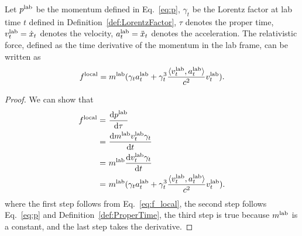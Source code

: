 \begin{lemma}\label{lem:equiv_relativistic_force:formal}
Let $p^{\rm lab}$ be the momentum defined in Eq.~\eqref{eq:p}, $\gamma_t$ be the Lorentz factor at lab time $t$ defined in Definition~\ref{def:LorentzFactor}, $\tau$ denotes the proper time, $v_t^{\rm lab} = \dot{x}_t$ denotes the velocity, 
$a_t^{\rm lab} = \ddot{x}_t$ denotes the acceleration.
The relativistic force, defined as the time derivative of the momentum in the lab frame, can be written as
\begin{align*}
f^{\rm local} =  m^{\rm lab}  (\gamma_t a_t^{\rm lab} + \gamma_t^3 \frac{ \langle v_t^{\rm lab}, a_t^{\rm lab} \rangle}{c^2} v_t^{\rm lab}).
\end{align*}

\end{lemma}
\begin{proof}
We can show that
\begin{align*}
f^{\rm local}  = & ~ \frac{\mathrm{d} p^{\rm lab}}{\mathrm{d} \tau}  \\
= & ~ \frac{\mathrm{d} m^{\rm lab} v_t^{\rm lab} \gamma_t}{\mathrm{d} t} \\
= & ~ m^{\rm lab} \frac{\mathrm{d} v_t^{\rm lab} \gamma_t}{\mathrm{d} t} \\
= & ~ m^{\rm lab}  (\gamma_t a_t^{\rm lab} + \gamma_t^3 \frac{ \langle v_t^{\rm lab}, a_t^{\rm lab} \rangle}{c^2} v_t^{\rm lab}).
\end{align*}
where the first step follows from Eq.~\eqref{eq:f_local}, the second step follows Eq.~\eqref{eq:p} and Definition~\ref{def:ProperTime}, the third step is true because $m^{\rm lab}$ is a constant, and the last step takes the derivative.
\end{proof}
